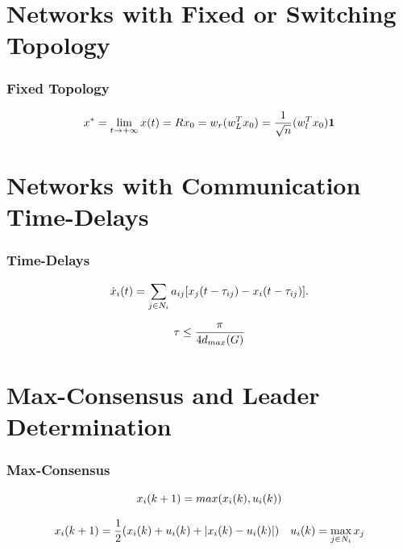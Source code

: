 \documentclass{beamer}
\begin{document}
\section{Networks with Fixed or Switching Topology}

\begin{frame}
\frametitle{Fixed Topology}

\begin{equation}
    x^* = \lim_{t\rightarrow +\infty}x(t) = Rx_0 = w_r(w_L^T x_0) = \frac{1}{\sqrt{n}}(w_l^Tx_0)\mathbf{1}
    \notag
\end{equation}

\end{frame}

\section{Networks with Communication Time-Delays}

\begin{frame}
\frametitle{Time-Delays}
\begin{equation}
    \dot{x}_i(t) = \sum_{j\in N_i} a_{ij} [x_j(t-\tau_{ij}) - x_i(t-\tau_{ij})].
    \notag
\end{equation}

\begin{equation}
    \tau \le \frac{\pi}{4d_{max}(G)}
    \notag
\end{equation}

\end{frame}

\section{Max-Consensus and Leader Determination}

\begin{frame}
\frametitle{Max-Consensus}

\begin{equation}
    \notag
    x_i(k+1)=max(x_i(k),u_i(k))
\end{equation}

\begin{equation}
    \notag
    x_i(k+1) = \frac{1}{2}(x_i(k)+u_i(k)+|x_i(k)-u_i(k)|) \quad u_i(k) = \max_{j\in N_i}x_j
\end{equation}

\end{frame}
\end{document}
